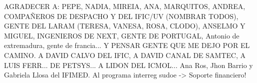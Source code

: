 AGRADECER A: PEPE, NADIA, MIREIA, ANA, MARQUITOS, ANDREA, COMPAÑEROS DE DESPACHO Y DEL IFIC/UV (NOMBRAR TODOS), GENTE DEL LARAM (TERESA, VANESA, ROSA, CLODO), ANSELMO Y MIGUEL, INGENIEROS DE NEXT, GENTE DE PORTUGAL, Antonio de extremadura, gente de francia... Y PENSAR GENTE QUE ME DEJO POR EL CAMINO. A DAVID CALVO DEL IFIC, A DAVID CANAL DE SAMTEC, A LUIS FERR... DE PETSYS... A LIDON DEL ICMOL... Ana Ros, Jhon Barrio y Gabriela Llosa del IFIMED. Al programa interreg sudoe -> Soporte financiero!